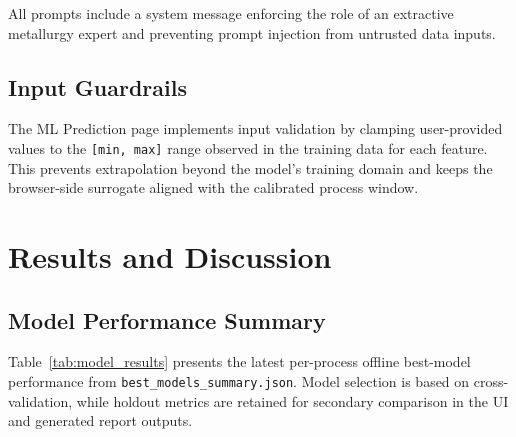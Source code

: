 \documentclass[12pt,a4paper]{report}
\newcommand{\code}[1]{\texttt{#1}}
\begin{document}
All prompts include a system message enforcing the role of an extractive metallurgy expert and preventing prompt injection from untrusted data inputs.

\section{Input Guardrails}

The ML Prediction page implements input validation by clamping user-provided values to the \texttt{[min, max]} range observed in the training data for each feature. This prevents extrapolation beyond the model's training domain and keeps the browser-side surrogate aligned with the calibrated process window.


\chapter{Results and Discussion}
\label{ch:results}

\section{Model Performance Summary}

Table~\ref{tab:model_results} presents the latest per-process offline best-model performance from \code{best\_models\_summary.json}. Model selection is based on cross-validation, while holdout metrics are retained for secondary comparison in the UI and generated report outputs.
\end{document}
